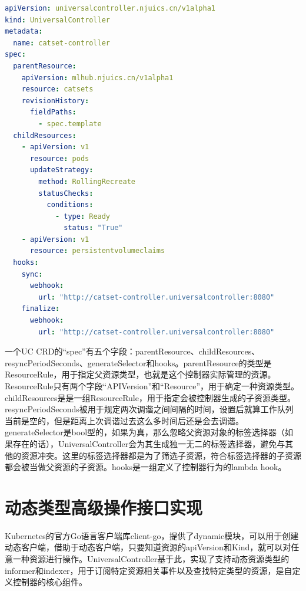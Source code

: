 \documentclass[macfonts,master]{njuthesis}
\begin{document}
\newpage
\begin{lstlisting}[language=yaml,caption=作为UC CRD示例的catset-controller,label=listing:catset-controller-config]
apiVersion: universalcontroller.njuics.cn/v1alpha1
kind: UniversalController
metadata:
  name: catset-controller
spec:
  parentResource:
    apiVersion: mlhub.njuics.cn/v1alpha1
    resource: catsets
    revisionHistory:
      fieldPaths:
        - spec.template
  childResources:
    - apiVersion: v1
      resource: pods
      updateStrategy:
        method: RollingRecreate
        statusChecks:
          conditions:
            - type: Ready
              status: "True"
    - apiVersion: v1
      resource: persistentvolumeclaims
  hooks:
    sync:
      webhook:
        url: "http://catset-controller.universalcontroller:8080"
    finalize:
      webhook:
        url: "http://catset-controller.universalcontroller:8080"
\end{lstlisting}


一个UC CRD的``spec''有五个字段：parentResource、childResources、resyncPeriodSeconds、generateSelector和hooks。parentResource的类型是ResourceRule，用于指定父资源类型，也就是这个控制器实际管理的资源。ResourceRule只有两个字段``APIVersion''和``Resource''，用于确定一种资源类型。childResources是是一组ResourceRule，用于指定会被控制器生成的子资源类型。resyncPeriodSeconds被用于规定两次调谐之间间隔的时间，设置后就算工作队列当前是空的，但是距离上次调谐过去这么多时间后还是会去调谐。generateSelector是bool型的，如果为真，那么忽略父资源对象的标签选择器（如果存在的话），UniversalController会为其生成独一无二的标签选择器，避免与其他的资源冲突。这里的标签选择器都是为了筛选子资源，符合标签选择器的子资源都会被当做父资源的子资源。hooks是一组定义了控制器行为的lambda hook。

\section{动态类型高级操作接口实现}

Kubernetes的官方Go语言客户端库client-go，提供了dynamic模块，可以用于创建动态客户端，借助于动态客户端，只要知道资源的apiVersion和Kind，就可以对任意一种资源进行操作。UniversalController基于此，实现了支持动态资源类型的informer和indexer，用于订阅特定资源相关事件以及查找特定类型的资源，是自定义控制器的核心组件。
\end{document}
